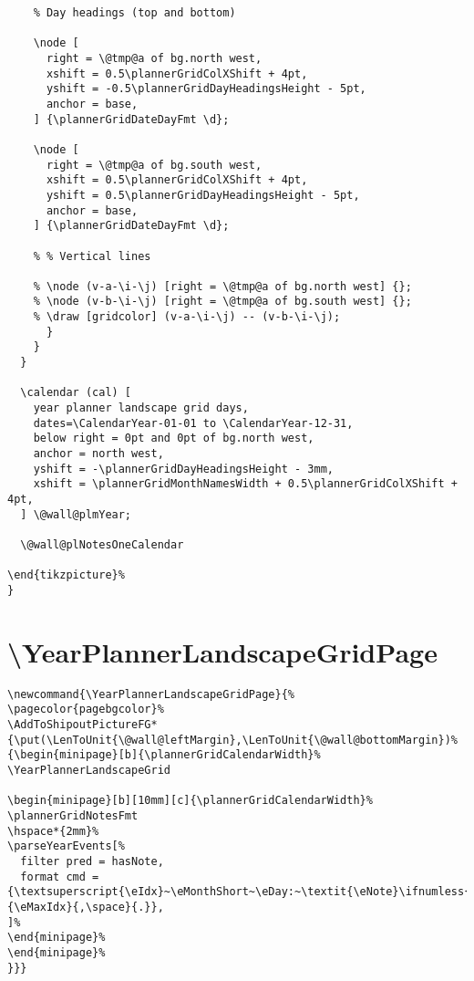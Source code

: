 \documentclass[11pt,oneside]{memoir-article}
\begin{document}
\begin{verbatim}
	% Day headings (top and bottom)

	\node [
	  right = \@tmp@a of bg.north west,
	  xshift = 0.5\plannerGridColXShift + 4pt,
	  yshift = -0.5\plannerGridDayHeadingsHeight - 5pt,
	  anchor = base,
	] {\plannerGridDateDayFmt \d};

	\node [
	  right = \@tmp@a of bg.south west,
	  xshift = 0.5\plannerGridColXShift + 4pt,
	  yshift = 0.5\plannerGridDayHeadingsHeight - 5pt,
	  anchor = base,
	] {\plannerGridDateDayFmt \d};

	% % Vertical lines

	% \node (v-a-\i-\j) [right = \@tmp@a of bg.north west] {};
	% \node (v-b-\i-\j) [right = \@tmp@a of bg.south west] {};
	% \draw [gridcolor] (v-a-\i-\j) -- (v-b-\i-\j);
      }
    }
  }

  \calendar (cal) [
    year planner landscape grid days,
    dates=\CalendarYear-01-01 to \CalendarYear-12-31,
    below right = 0pt and 0pt of bg.north west,
    anchor = north west,
    yshift = -\plannerGridDayHeadingsHeight - 3mm,
    xshift = \plannerGridMonthNamesWidth + 0.5\plannerGridColXShift + 4pt,
  ] \@wall@plmYear;

  \@wall@plNotesOneCalendar

\end{tikzpicture}%
}
\end{verbatim}

\section{\textbackslash YearPlannerLandscapeGridPage}
\label{sec:org7174f1d}

\begin{verbatim}
\newcommand{\YearPlannerLandscapeGridPage}{%
\pagecolor{pagebgcolor}%
\AddToShipoutPictureFG*{\put(\LenToUnit{\@wall@leftMargin},\LenToUnit{\@wall@bottomMargin})%
{\begin{minipage}[b]{\plannerGridCalendarWidth}%
\YearPlannerLandscapeGrid

\begin{minipage}[b][10mm][c]{\plannerGridCalendarWidth}%
\plannerGridNotesFmt
\hspace*{2mm}%
\parseYearEvents[%
  filter pred = hasNote,
  format cmd = {\textsuperscript{\eIdx}~\eMonthShort~\eDay:~\textit{\eNote}\ifnumless{\eIdx}{\eMaxIdx}{,\space}{.}},
]%
\end{minipage}%
\end{minipage}%
}}}
\end{verbatim}
\end{document}
